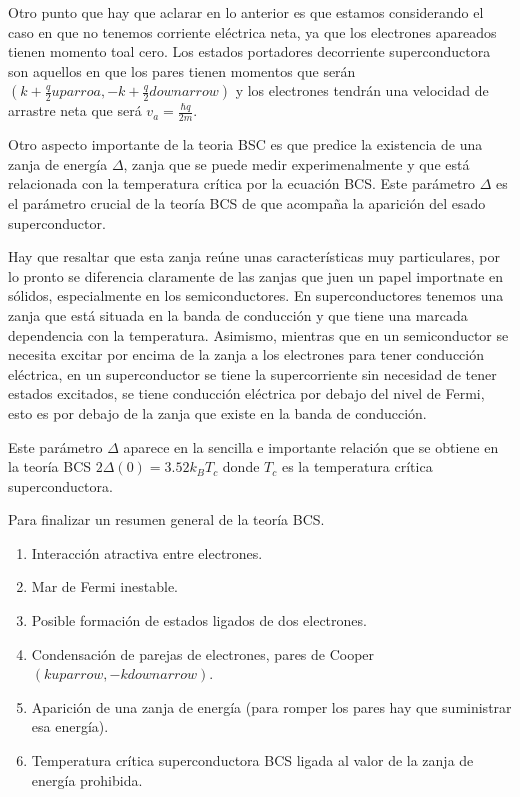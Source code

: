 Otro punto que hay que aclarar en lo anterior es que estamos considerando el caso en que no tenemos corriente eléctrica neta, ya que los electrones apareados tienen momento toal cero. Los estados portadores  decorriente superconductora son aquellos en que los pares tienen momentos que serán $(k + \frac{q}{2} uparroa, -k + \frac{q}{2} downarrow)$ y los electrones tendrán una velocidad de arrastre neta que será $v_a = \frac{\hbar q}{2m}$.

Otro aspecto importante de la teoria BSC es que predice la existencia de una zanja de energía $\Delta$, zanja que se puede medir experimenalmente y que está relacionada con la temperatura crítica por la ecuación BCS. Este parámetro $\Delta$ es el parámetro crucial de la teoría BCS de que acompaña la aparición del esado superconductor.

Hay que resaltar que esta zanja reúne unas características muy particulares, por lo pronto se diferencia claramente de las zanjas que juen un papel importnate en sólidos, especialmente en los semiconductores. En superconductores tenemos una zanja que está situada en la banda de conducción y que tiene una marcada dependencia con la temperatura. Asimismo, mientras que en un semiconductor se necesita excitar por encima de la zanja a los electrones para tener conducción eléctrica, en un superconductor se tiene la supercorriente sin necesidad de tener estados excitados, se tiene conducción eléctrica por debajo del nivel de Fermi, esto es por debajo de la zanja que existe en la banda de conducción.

Este parámetro $\Delta$ aparece en la sencilla e importante relación que se obtiene en la teoría BCS $2 \Delta(0) = 3.52 k_B T_c$ donde $T_c$ es la temperatura crítica superconductora.

Para finalizar un resumen general de la teoría BCS.

\begin{enumerate}
    \item Interacción atractiva entre electrones.
    \item Mar de Fermi inestable.
    \item Posible formación de estados ligados de dos electrones.
    \item Condensación de parejas de electrones, pares de Cooper $(k uparrow, -k downarrow)$.
    \item Aparición de una zanja de energía (para romper los pares hay que suministrar esa energía).
    \item Temperatura crítica superconductora BCS ligada al valor de la zanja de energía prohibida.
\end{enumerate}


